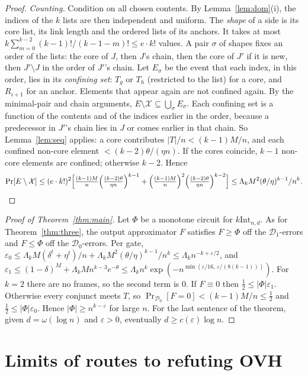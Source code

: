 \documentclass[11pt,a4paper]{article}
\theoremstyle{plain}
\theoremstyle{definition}
\theoremstyle{remark}
\newcommand{\kInt}{k\mathrm{Int}}
\newcommand{\Dz}{\mathcal{D}_0}
\newcommand{\Do}{\mathcal{D}_1}
\begin{document}
\begin{proof}
\emph{Counting.} Condition on all chosen contents. By Lemma~\ref{lem:dom}(i), the indices of the $k$ lists are then
independent and uniform. The \emph{shape} of a side is its core list, its link length and the ordered lists of its
anchors. It takes at most $k\sum_{m=0}^{k-2}(k-1)!/(k-1-m)!\le e\cdot k!$ values. A pair $\sigma$ of shapes fixes an
order of the lists: the core of $J$, then $J$'s chain, then the core of $J'$ if it is new, then $J'\setminus J$ in the
order of $J'$'s chain. Let $E_\sigma$ be the event that each index, in this order, lies in its \emph{confining set}:
$T_g$ or $T_h$ (restricted to the list) for a core, and $R_{i+1}$ for an anchor. Elements that appear again are not
confined again. By the minimal-pair and chain arguments, $E\setminus\mathcal X\subseteq\bigcup_\sigma E_\sigma$. Each
confining set is a function of the contents and of the indices earlier in the order, because a predecessor in $J'$'s
chain lies in $J$ or comes earlier in that chain. So Lemma~\ref{lem:seq} applies: a core contributes $|T|/n<(k-1)M/n$,
and each confined non-core element $<(k-2)\theta/(\eta n)$. If the cores coincide, $k-1$ non-core elements are
confined; otherwise $k-2$. Hence
\[
\Pr[E\setminus\mathcal X]\le(e\cdot k!)^2\Big[\tfrac{(k-1)M}{n}\Big(\tfrac{(k-2)\theta}{\eta n}\Big)^{k-1}
+\Big(\tfrac{(k-1)M}{n}\Big)^2\Big(\tfrac{(k-2)\theta}{\eta n}\Big)^{k-2}\Big]
\le\Lambda_kM^2(\theta/\eta)^{k-1}/n^k.\qedhere
\]
\end{proof}

\begin{proof}[Proof of Theorem~\ref{thm:main}]
Let $\Phi$ be a monotone circuit for $\kInt_{n,d}$. As for Theorem~\ref{thm:three}, the output approximator $F$
satisfies $F\ge\Phi$ off the $\Do$-errors and $F\le\Phi$ off the $\Dz$-errors. Per gate, $\varepsilon_0\le \Lambda_kM(\delta^t+\eta^t)/n+\Lambda_kM^2(\theta/\eta)^{k-1}/n^k\le
\Lambda_kn^{-k+\varepsilon/2}$, and $\varepsilon_1\le(1-\delta)^M+\Lambda_kMn^{k-3}e^{-\theta}\le
\Lambda_kn^k\exp(-n^{\min(\varepsilon/16,\,\varepsilon/(8(k-1)))})$. For $k=2$ there are no frames, so the second term is
0. If $F\equiv0$ then $\frac12\le|\Phi|\varepsilon_1$. Otherwise every conjunct meets $T$, so $\Pr_{\Dz}[F=0]<(k-1)M/n
\le\frac12$ and $\frac12\le|\Phi|\varepsilon_0$. Hence $|\Phi|\ge n^{k-\varepsilon}$ for large $n$. For the last sentence of the
theorem, given $d=\omega(\log n)$ and $\varepsilon>0$, eventually $d\ge c(\varepsilon)\log n$.
\end{proof}

\section{Limits of routes to refuting OVH}\label{sec:trackA}
\end{document}
